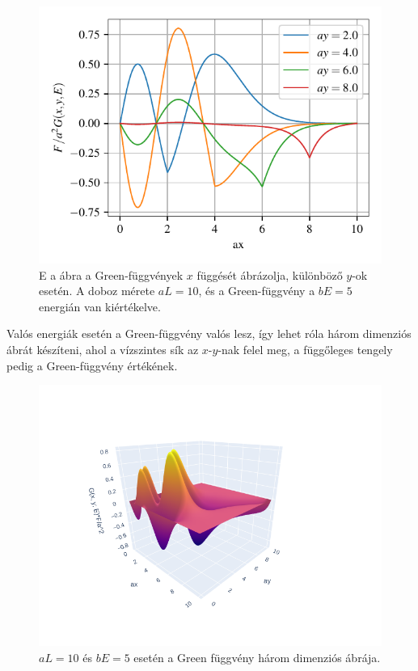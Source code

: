 \begin{figure}[H]
	\centering
	\includegraphics[scale=1]{./figs/1dgreens.pdf}
	\caption[Egy dimenziós Green-függvény]{E a ábra a Green-függvények $x$ függését ábrázolja, különböző $y$-ok esetén. A doboz mérete $aL=10$, és a Green-függvény a $bE=5$ energián van kiértékelve.}
	\label{egzakt:1dgreens}
\end{figure}
Valós energiák esetén a Green-függvény valós lesz, így lehet róla három dimenziós ábrát készíteni, ahol a vízszintes sík az $x$-$y$-nak felel meg, a függőleges tengely pedig a Green-függvény értékének.
\begin{figure}[H]
	\centering
	\includegraphics[scale=0.65]{./figs/2dgreen.png}
	\caption[Két dimenziós Green-függvény]{$aL=10$ és $bE=5$ esetén a Green függvény három dimenziós ábrája.}
	\label{egzakt:2dgreen}
\end{figure}

